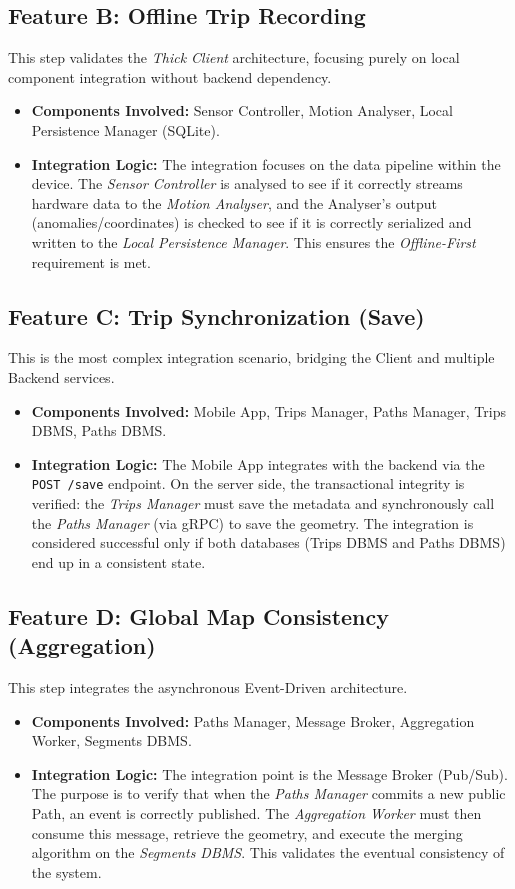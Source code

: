 \subsection*{Feature B: Offline Trip Recording}
This step validates the \emph{Thick Client} architecture, focusing purely on local component integration without backend dependency.
\begin{itemize}
    \item \textbf{Components Involved:} Sensor Controller, Motion Analyser, Local Persistence Manager (SQLite).
    \item \textbf{Integration Logic:} The integration focuses on the data pipeline within the device. The \emph{Sensor Controller} is analysed to see if it correctly streams hardware data to the \emph{Motion Analyser}, and the Analyser's output (anomalies/coordinates) is checked to see if it is correctly serialized and written to the \emph{Local Persistence Manager}. This ensures the \emph{Offline-First} requirement is met.
\end{itemize}

\subsection*{Feature C: Trip Synchronization (Save)}
This is the most complex integration scenario, bridging the Client and multiple Backend services.
\begin{itemize}
    \item \textbf{Components Involved:} Mobile App, Trips Manager, Paths Manager, Trips DBMS, Paths DBMS.
    \item \textbf{Integration Logic:} The Mobile App integrates with the backend via the \texttt{POST /save} endpoint. On the server side, the transactional integrity is verified: the \emph{Trips Manager} must save the metadata and synchronously call the \emph{Paths Manager} (via gRPC) to save the geometry. The integration is considered successful only if both databases (Trips DBMS and Paths DBMS) end up in a consistent state.
\end{itemize}

\subsection*{Feature D: Global Map Consistency (Aggregation)}
This step integrates the asynchronous Event-Driven architecture.
\begin{itemize}
    \item \textbf{Components Involved:} Paths Manager, Message Broker, Aggregation Worker, Segments DBMS.
    \item \textbf{Integration Logic:} The integration point is the Message Broker (Pub/Sub). The purpose is to verify that when the \emph{Paths Manager} commits a new public Path, an event is correctly published. The \emph{Aggregation Worker} must then consume this message, retrieve the geometry, and execute the merging algorithm on the \emph{Segments DBMS}. This validates the eventual consistency of the system.
\end{itemize}

